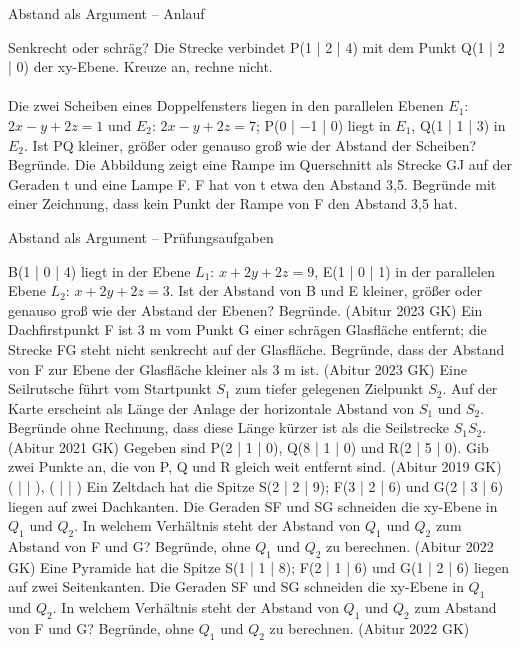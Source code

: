 \begin{aufgabe}{Abstand als Argument – Anlauf}
\begin{teile}
\teil Senkrecht oder schräg? Die Strecke verbindet P(1 | 2 | 4) mit dem Punkt Q(1 | 2 | 0) der xy-Ebene. Kreuze an, rechne nicht. \\  \\ 
\teil Die zwei Scheiben eines Doppelfensters liegen in den parallelen Ebenen $E_1$: $2x - y + 2z = 1$ und $E_2$: $2x - y + 2z = 7$; P(0 | −1 | 0) liegt in $E_1$, Q(1 | 1 | 3) in $E_2$. Ist PQ kleiner, größer oder genauso groß wie der Abstand der Scheiben? Begründe.
\teil Die Abbildung zeigt eine Rampe im Querschnitt als Strecke GJ auf der Geraden t und eine Lampe F. F hat von t etwa den Abstand 3,5. Begründe mit einer Zeichnung, dass kein Punkt der Rampe von F den Abstand 3,5 hat.

\begin{ksys}[xmin=0,xmax=8,ymin=0,ymax=8]
\end{ksys}
\end{teile}
\end{aufgabe}

\begin{aufgabe}{Abstand als Argument – Prüfungsaufgaben}
\begin{teile}
\teil B(1 | 0 | 4) liegt in der Ebene $L_1$: $x + 2y + 2z = 9$, E(1 | 0 | 1) in der parallelen Ebene $L_2$: $x + 2y + 2z = 3$. Ist der Abstand von B und E kleiner, größer oder genauso groß wie der Abstand der Ebenen? Begründe. \hfill (Abitur 2023 GK)
\teil Ein Dachfirstpunkt F ist 3 m vom Punkt G einer schrägen Glasfläche entfernt; die Strecke FG steht nicht senkrecht auf der Glasfläche. Begründe, dass der Abstand von F zur Ebene der Glasfläche kleiner als 3 m ist. \hfill (Abitur 2023 GK)
\teil Eine Seilrutsche führt vom Startpunkt $S_1$ zum tiefer gelegenen Zielpunkt $S_2$. Auf der Karte erscheint als Länge der Anlage der horizontale Abstand von $S_1$ und $S_2$. Begründe ohne Rechnung, dass diese Länge kürzer ist als die Seilstrecke $S_1S_2$. \hfill (Abitur 2021 GK)
\teil Gegeben sind P(2 | 1 | 0), Q(8 | 1 | 0) und R(2 | 5 | 0). Gib zwei Punkte an, die von P, Q und R gleich weit entfernt sind. \hfill (Abitur 2019 GK) \\ ( \leerfeld | \leerfeld | \leerfeld ), ( \leerfeld | \leerfeld | \leerfeld )
\teil Ein Zeltdach hat die Spitze S(2 | 2 | 9); F(3 | 2 | 6) und G(2 | 3 | 6) liegen auf zwei Dachkanten. Die Geraden SF und SG schneiden die xy-Ebene in $Q_1$ und $Q_2$. In welchem Verhältnis steht der Abstand von $Q_1$ und $Q_2$ zum Abstand von F und G? Begründe, ohne $Q_1$ und $Q_2$ zu berechnen. \hfill (Abitur 2022 GK)
\teil Eine Pyramide hat die Spitze S(1 | 1 | 8); F(2 | 1 | 6) und G(1 | 2 | 6) liegen auf zwei Seitenkanten. Die Geraden SF und SG schneiden die xy-Ebene in $Q_1$ und $Q_2$. In welchem Verhältnis steht der Abstand von $Q_1$ und $Q_2$ zum Abstand von F und G? Begründe, ohne $Q_1$ und $Q_2$ zu berechnen. \hfill (Abitur 2022 GK)
\end{teile}
\end{aufgabe}
